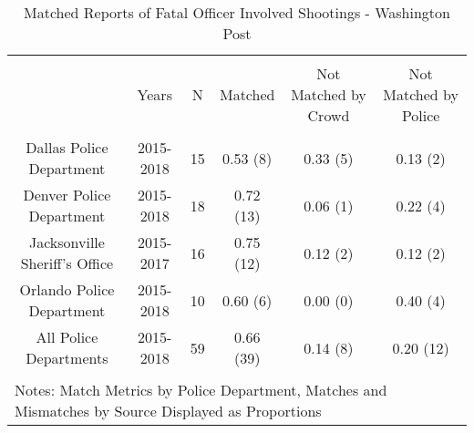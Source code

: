 
\begin{table}[!htbp] \centering 
  \caption{Matched Reports of Fatal Officer Involved Shootings - Washington Post} 
  \label{} 
\footnotesize 
\begin{tabular}{@{\extracolsep{5pt}} cccccc} 
\\[-1.8ex]\hline 
\hline \\[-1.8ex] 
 & Years & N & Matched & Not Matched by Crowd & Not Matched by Police \\ 
\hline \\[-1.8ex] 
Dallas Police Department & 2015-2018 & 15 & 0.53 (8) & 0.33 (5) & 0.13 (2) \\ 
Denver Police Department & 2015-2018 & 18 & 0.72 (13) & 0.06 (1) & 0.22 (4) \\ 
Jacksonville Sheriff's Office & 2015-2017 & 16 & 0.75 (12) & 0.12 (2) & 0.12 (2) \\ 
Orlando Police Department & 2015-2018 & 10 & 0.60 (6) & 0.00 (0) & 0.40 (4) \\ 
All Police Departments   & 2015-2018 & 59 & 0.66 (39) & 0.14 (8) & 0.20 (12) \\ 
\hline \\[-1.8ex] 
\multicolumn{6}{l}{Notes: Match Metrics by Police Department, Matches and Mismatches by Source Displayed as Proportions} \\ 
\end{tabular} 
\end{table}  
